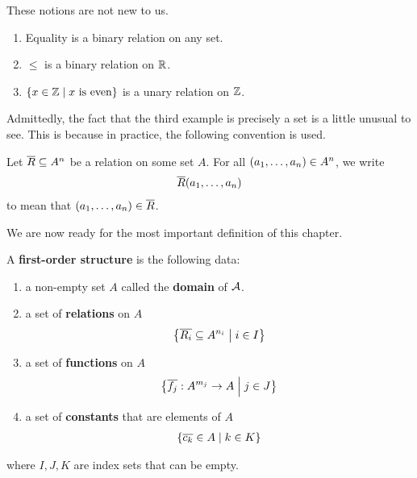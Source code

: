 These notions are not new to us.

\begin{boxexample}
    \hfill
    \begin{enumerate}
        \item Equality is a binary relation on any set.
        \item $\leq$ is a binary relation on $\mathbb{R}$.
        \item $\left\{ x \in \mathbb{Z} \; \middle\vert \; x \text{ is even} \right\}$ is a unary relation on $\mathbb{Z}$.
    \end{enumerate}
\end{boxexample}

Admittedly, the fact that the third example is precisely a set is a little unusual to see. This is because in practice, the following convention is used.

\begin{boxconvention}
    Let $\overline{R} \subseteq A^n$ be a relation on some set $A$. For all $\left( a_1, \ldots, a_n \right) \in A^n$, we write
    \begin{align*}
        \overline{R}\!\left( a_1, \ldots, a_n \right)
    \end{align*}
    to mean that $\left( a_1, \ldots, a_n \right) \in \overline{R}$.
\end{boxconvention}

We are now ready for the most important definition of this chapter.

\begin{boxdefinition}\label{Ch2:Def:First-Order_Structure}
    A \textbf{first-order structure} is the following data:
    \begin{enumerate}
        \item a non-empty set $A$ called the \textbf{domain} of $\mathcal{A}$.
        
        \item a set of \textbf{relations} on $A$
        \begin{align*}
            \left\{ \overline{R_i} \subseteq A^{n_i} \; \middle\vert \; i \in I \right\}
        \end{align*}

        \item a set of \textbf{functions} on $A$
        \begin{align*}
            \left\{ \overline{f_j} : A^{m_j} \to A \; \middle\vert \; j \in J \right\}
        \end{align*}

        \item a set of \textbf{constants} that are elements of $A$
        \begin{align*}
            \left\{ \overline{c_k} \in A \; \middle\vert \; k \in K \right\}
        \end{align*}
    \end{enumerate}
    where $I, J, K$ are index sets that can be empty.
\end{boxdefinition}

